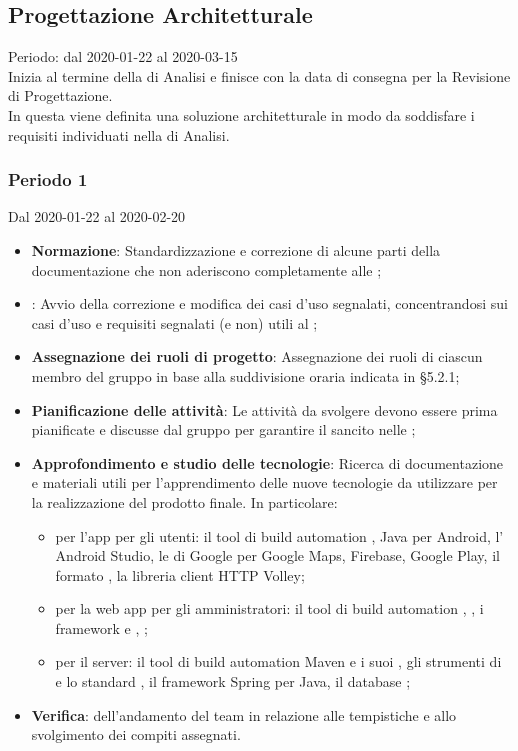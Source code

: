 \subsection{Progettazione Architetturale}
Periodo: dal 2020-01-22 al 2020-03-15\\
Inizia al termine della  di Analisi e finisce con la data di consegna per la Revisione di Progettazione.\\
In questa  viene definita una soluzione architetturale in modo da soddisfare i requisiti individuati nella  di Analisi.

\subsubsection{Periodo 1} 
Dal 2020-01-22 al 2020-02-20
\begin{itemize}
	\item \textbf{Normazione}: Standardizzazione e correzione di alcune parti della documentazione che non aderiscono completamente alle \NdP{};
	\item \textbf{\AdR{}}: Avvio della correzione e modifica dei casi d'uso segnalati, concentrandosi sui casi d'uso e requisiti segnalati (e non) utili al ;
	\item \textbf{Assegnazione dei ruoli di progetto}: Assegnazione dei ruoli di ciascun membro del gruppo in base alla suddivisione oraria indicata in §5.2.1;
	\item \textbf{Pianificazione delle attività}: Le attività da svolgere devono essere prima pianificate e discusse dal gruppo per garantire il  sancito nelle \NdP{};
	\item \textbf{Approfondimento e studio delle tecnologie}: Ricerca di documentazione e materiali utili per l'apprendimento delle nuove tecnologie da utilizzare per la realizzazione del prodotto finale.
	In particolare:
	\begin{itemize}
		\item per l'app per gli utenti: il tool di build automation , Java per Android, l' Android Studio, le  di Google per Google Maps, Firebase, Google Play, il formato , la libreria client HTTP Volley;
		\item per la web app per gli amministratori: il tool di build automation , , i framework  e , ;
		\item per il server: il tool di build automation Maven e i suoi , gli strumenti di  e lo standard , il framework Spring per Java, il database ;
	\end{itemize}
	\item \textbf{Verifica}:  dell'andamento del team in relazione alle tempistiche e allo svolgimento dei compiti assegnati.
\end{itemize}
